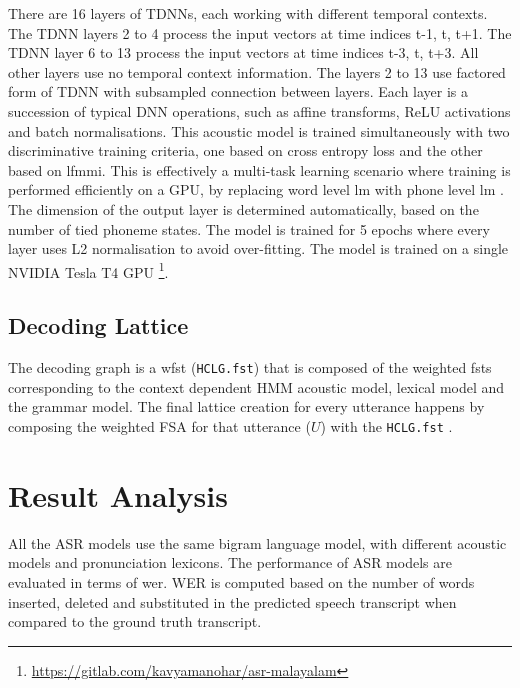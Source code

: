 There are 16 layers of TDNNs, each working with different temporal contexts. The TDNN layers 2 to 4 process the input vectors at time indices t-1, t, t+1. The TDNN layer 6 to 13 process the input vectors at time indices t-3, t, t+3.  All other layers use no temporal context information. The layers 2 to 13 use factored form of TDNN with subsampled connection between layers.  Each layer is a succession of typical DNN operations, such as affine transforms,
ReLU activations and batch normalisations. This  acoustic model
 is trained simultaneously with two discriminative training criteria, one based on cross entropy loss and the other based on \gls{lfmmi}. This is effectively a multi-task learning scenario where training is  performed efficiently on a GPU, by replacing word level \gls{lm} with phone level \gls{lm} \cite{povey2016purely}. The dimension of the output layer is determined automatically, based on the number of tied phoneme states.  The model is trained for 5 epochs where every layer uses L2 normalisation to avoid over-fitting.  The model is trained on a single NVIDIA
Tesla T4 GPU \footnote{\url{https://gitlab.com/kavyamanohar/asr-malayalam}}. 



\subsection{Decoding Lattice}

The decoding graph is a \gls{wfst} (\texttt{HCLG.fst}) that is composed of the
weighted \gls{fst}s corresponding to the context dependent HMM acoustic model,
lexical model and the grammar model. The final lattice creation for every
utterance happens by composing the weighted FSA for that utterance ($U$) with the
\texttt{HCLG.fst} \cite{povey2012generating,madhavaraj2020strategies}.

\section{Result Analysis }

All the ASR models use the same bigram language model, with different acoustic
models and pronunciation lexicons. The performance of ASR models are evaluated
in terms of \gls{wer}. WER is computed based on the number of words inserted,
deleted and substituted in the predicted speech transcript when
compared to the ground truth transcript.


